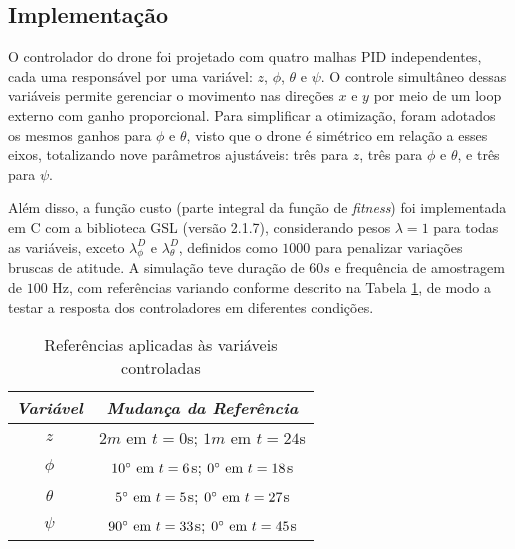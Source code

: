 \subsection{Implementação}
O controlador do drone foi projetado com quatro malhas PID independentes, cada uma responsável por 
uma variável: $z$, $\phi$, $\theta$ e $\psi$. O controle 
simultâneo dessas variáveis permite gerenciar o movimento nas direções $x$ e $y$ por meio de um 
loop externo com ganho proporcional. Para simplificar a otimização, foram adotados os mesmos ganhos para $\phi$ e $\theta$, 
visto que o drone é simétrico em relação a esses eixos, totalizando nove parâmetros ajustáveis: 
três para $z$, três para $\phi$ e $\theta$, e três para $\psi$.

Além disso, a função custo (parte integral da função de \textit{fitness}) 
foi implementada em C com a biblioteca GSL (versão 2.1.7), considerando pesos $\lambda = 1$ para 
todas as variáveis, exceto $\lambda^D_{\phi}$ e $\lambda^D_{\theta}$, definidos como $1000$ para 
penalizar variações bruscas de atitude. A simulação teve duração de $60s$ e frequência de amostragem 
de $100$ Hz, com referências variando conforme descrito na Tabela \ref{tab:ref_traj}, de modo a 
testar a resposta dos controladores em diferentes condições.
\vspace{-0.5cm}
\begin{center}
    \begin{longtable}{|c|c|}
        \caption{Referências aplicadas às variáveis controladas} \vspace{-0.7cm}
        \label{tab:ref_traj}
        \hline
        \emph{Variável} & \emph{Mudança da Referência} \\
        \hline
        \endfirsthead
        \endhead

        $z$ & $2m \text{ em } t=0$s; $1m \text{ em } t=24$s \\
        \hline
        $\phi$ & $10\degree \text{ em } t=6$s; $0\degree \text{ em } t=18$s \\
        \hline
        $\theta$ & $5\degree \text{ em } t=5$s; $0\degree \text{ em } t=27$s \\
        \hline
        $\psi$ & $90\degree \text{ em } t=33$s; $0\degree \text{ em } t=45$s \\
        \hline
    \end{longtable}
\end{center}
\vspace{-1.5cm}

